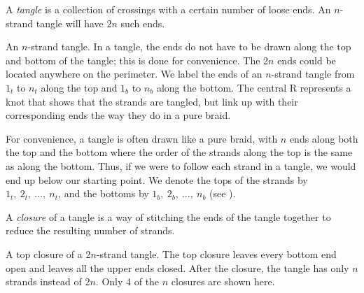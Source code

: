 \begin{paper}

A \textit{tangle} is a collection of crossings with a certain number of loose
ends.
An $n$-strand tangle will have $2n$ such ends.

{An $n$-strand tangle.
In a tangle, the ends do not have to be drawn along the top and bottom of the
tangle; this is done for convenience.
The $2n$ ends could be located anywhere on the perimeter.
We label the ends of an $n$-strand tangle from $1_t$ to $n_t$ along the top and
$1_b$ to $n_b$ along the bottom.
The central R represents a knot that shows that the strands are tangled, but
link up with their corresponding ends the way they do in a pure braid.}

For convenience, a tangle is often drawn like a pure braid, with $n$ ends along
both the top and the bottom where the order of the strands along the top is the
same as along the bottom.
Thus, if we were to follow each strand in a tangle, we would end up below our
starting point.
We denote the tops of the strands by $1_t,~2_t,~\dots,~n_t$, and the
bottoms  by $1_b,~2_b,~\dots,~n_b$ (see \figTangle).

A \textit{closure} of a tangle is a way of stitching the ends of the tangle
together to reduce the resulting number of strands.

{A top closure of a $2n$-strand tangle.
The top closure leaves every bottom end open and leaves all the upper ends
closed.
After the closure, the tangle has only $n$ strands instead of $2n$.
Only 4 of the $n$ closures are shown here.}


\end{paper}
